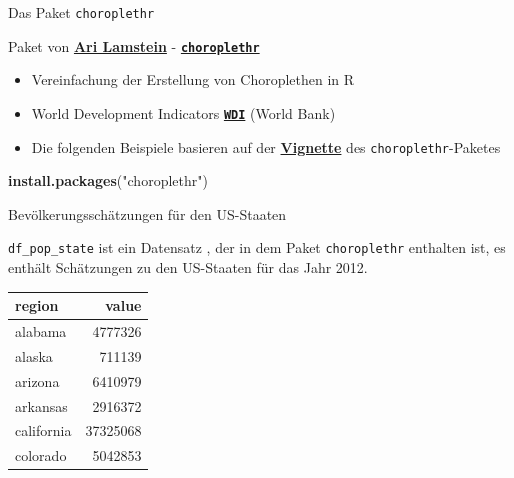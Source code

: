 \documentclass[ignorenonframetext,]{beamer}
\newenvironment{Shaded}{\begin{snugshade}}{\end{snugshade}}
\newcommand{\KeywordTok}[1]{\textcolor[rgb]{0.13,0.29,0.53}{\textbf{#1}}}
\newcommand{\StringTok}[1]{\textcolor[rgb]{0.31,0.60,0.02}{#1}}
\newcommand{\NormalTok}[1]{#1}
\begin{document}
\begin{frame}[fragile]{Das Paket \texttt{choroplethr}}

\begin{block}{Paket von \href{http://www.arilamstein.com/}{\textbf{Ari
Lamstein}} -
\href{https://cran.r-project.org/web/packages/choroplethr/index.html}{\textbf{\texttt{choroplethr}}}}

\begin{itemize}
\item
  Vereinfachung der Erstellung von Choroplethen in R
\item
  World Development Indicators
  \href{https://cran.r-project.org/web/packages/WDI/index.html}{\textbf{\texttt{WDI}}}
  (World Bank)
\item
  Die folgenden Beispiele basieren auf der
  \href{https://cran.r-project.org/web/packages/choroplethr/index.html}{\textbf{Vignette}}
  des \texttt{choroplethr}-Paketes
\end{itemize}

\begin{Shaded}
\begin{Highlighting}[]
\KeywordTok{install.packages}\NormalTok{(}\StringTok{"choroplethr"}\NormalTok{)}
\end{Highlighting}
\end{Shaded}

\end{block}

\end{frame}

\begin{frame}[fragile]{Bevölkerungsschätzungen für den US-Staaten}

\texttt{df\_pop\_state} ist ein Datensatz , der in dem Paket
\texttt{choroplethr} enthalten ist, es enthält Schätzungen zu den
US-Staaten für das Jahr 2012.

\begin{longtable}[]{@{}lr@{}}
\toprule
region & value\tabularnewline
\midrule
\endhead
alabama & 4777326\tabularnewline
alaska & 711139\tabularnewline
arizona & 6410979\tabularnewline
arkansas & 2916372\tabularnewline
california & 37325068\tabularnewline
colorado & 5042853\tabularnewline
\bottomrule
\end{longtable}

\end{frame}
\end{document}
